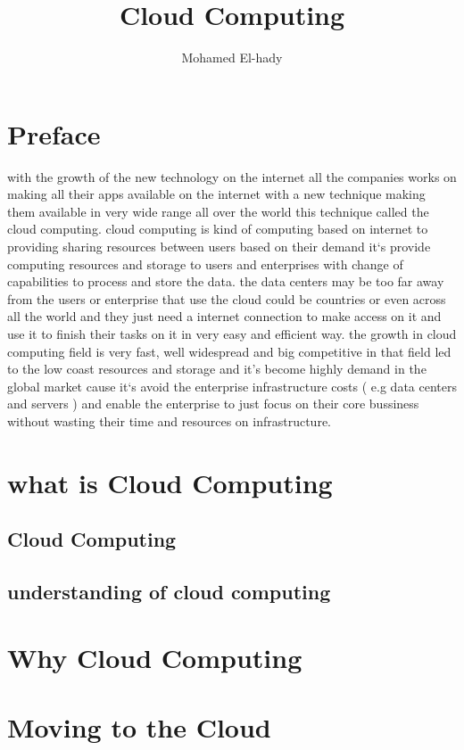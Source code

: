 \documentclass [12pt]{book}
\author{Mohamed El-hady}
\begin{document}
\title{Cloud Computing }
	\maketitle
	 \tableofcontents 
	\chapter*{Preface}
	with the growth of the new technology on the internet all the companies works on making all their apps available on the internet with a new technique making them available in very wide range all over the world this technique called the cloud computing.
	\newline
	cloud computing is kind of computing based on internet to providing sharing resources between users based on their demand it`s provide computing resources and storage to users and enterprises with change of capabilities to process and store the data.
	\newline
	the data centers may be too far away from the users or enterprise that use the cloud could be countries or even across all the world and they just need a internet connection to make access on it and use it to finish their tasks on it in very easy and efficient way.
	\newline
	the growth in cloud computing field is very fast, well widespread and big competitive in that field led to the low coast resources and storage and it's become highly demand in the global market cause it`s avoid the enterprise infrastructure costs ( e.g data centers and servers )    and enable the enterprise to just focus on their core bussiness without wasting their time and resources on infrastructure.
	
	
	\chapter{what is Cloud Computing}
	\section{Cloud Computing}
	\section{understanding of cloud computing }
	\chapter{Why Cloud Computing }
	\chapter{Moving to the Cloud}
\end{document}
